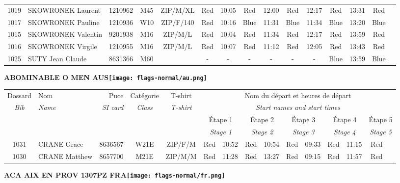 \documentclass{report}
\begin{document}
\begin{longtable}{|c|l|r|c|c|*{5}{cc|}}
    1019 & SKOWRONEK Laurent & 1210962 & M45 & ZIP/M/XL & Red & 10:05 & Red & 12:00 & Red & 12:17 & Red & 13:31 & Red &  \\
    1017 & SKOWRONEK Pauline & 1210936 & W10 & ZIP/F/140 & Red & 10:16 & Blue & 11:31 & Blue & 11:34 & Blue & 13:20 & Blue &  \\
    1015 & SKOWRONEK Valentin & 9201938 & M16 & ZIP/M/L & Red & 10:04 & Red & 11:34 & Red & 12:17 & Red & 13:59 & Red &  \\
    1016 & SKOWRONEK Virgile & 1210955 & M16 & ZIP/M/L & Red & 10:07 & Red & 11:12 & Red & 12:05 & Red & 13:43 & Red &  \\
    1025 & SUTY Jean Claude & 8631366 & M60 &   & - &  - & - &  - & - &  - & Blue & 13:59 & Blue &  \\
  \end{longtable}
\newpage
  \Huge \centering \bfseries ABOMINABLE O MEN  AUS\normalfont \footnotesize \sffamily \hfill \texttt{[image: flags-normal/au.png]} \newline 
  \begin{longtable}{|c|l|r|c|c|*{5}{cc|}}
    Dossard & Nom  & Puce    & Catégorie & T-shirt & \multicolumn{10}{c|}{Nom du départ et heures de départ} \\
    \itshape Bib     & \itshape Name & \itshape SI card & \itshape Class  & \itshape  T-shirt  & \multicolumn{10}{c|}{\itshape Start names and start times} \\
    \hline
    & & & & & \multicolumn{2}{c|}{Étape 1} & \multicolumn{2}{c|}{Étape 2} & \multicolumn{2}{c|}{Étape 3} & \multicolumn{2}{c|}{Étape 4} & \multicolumn{2}{c|}{Étape 5} \\
    & & & & & \multicolumn{2}{c|}{\itshape Stage 1} & \multicolumn{2}{c|}{\itshape Stage 2} & \multicolumn{2}{c|}{\itshape Stage 3} & \multicolumn{2}{c|}{\itshape Stage 4} & \multicolumn{2}{c|}{\itshape Stage 5} \\
    \hline
    1031 & CRANE Grace & 8636567 & W21E & ZIP/F/M & Red & 10:52 & Red & 10:54 & Red & 09:33 & Red & 11:15 & Red &  \\
    1030 & CRANE Matthew & 8657700 & M21E & ZIP/M/M & Red & 11:28 & Red & 13:27 & Red & 09:15 & Red & 11:57 & Red &  \\
  \end{longtable}
\newpage
  \Huge \centering \bfseries ACA AIX EN PROV 1307PZ FRA\normalfont \footnotesize \sffamily \hfill \texttt{[image: flags-normal/fr.png]} \newline 
\end{document}

